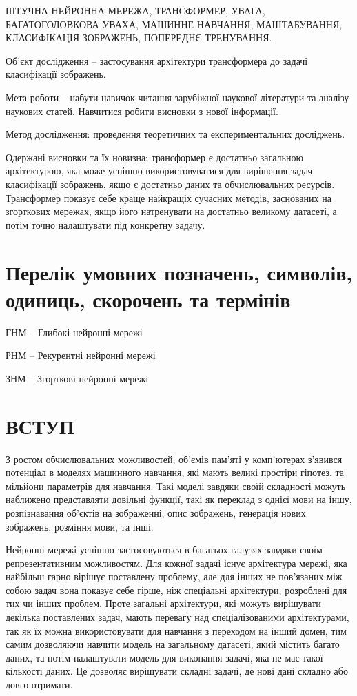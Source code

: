 \documentclass[a4paper,14pt]{extreport}
\newcommand\uchapter[1]{%
  \chapter*{#1}%
  \addcontentsline{toc}{chapter}{\xmakefirstuc{\lowercase{#1}}}}
\begin{document}
\vspace{\baselineskip}

ШТУЧНА НЕЙРОННА МЕРЕЖА, ТРАНСФОРМЕР,
УВАГА, БАГАТОГОЛОВКОВА УВАХА, МАШИННЕ НАВЧАННЯ,
МАШТАБУВАННЯ, КЛАСИФІКАЦІЯ ЗОБРАЖЕНЬ,
ПОПЕРЕДНЄ ТРЕНУВАННЯ.

\vspace{\baselineskip}

Об’єкт дослідження -- застосування архітектури
трансформера до задачі класифікації зображень.

Мета роботи -- набути навичок читання зарубіжної наукової літератури та аналізу наукових статей. Навчитися робити висновки з нової інформації.

Метод дослідження: проведення теоретичних та експериментальних досліджень.

Одержані висновки та їх новизна: трансформер є достатньо загальною
архітектурою, яка може успішно використовуватися для вирішення задач
класифікації зображень, якщо є достатньо даних та обчислювальних ресурсів.
Трансформер показує себе краще найкращіх сучасних методів, заснованих на
згорткових мережах, якщо його натренувати на достатньо великому датасеті,
а потім точно налаштувати під конкретну задачу.

\newpage
\tableofcontents

\newpage
\chapter*{Перелік умовних позначень, символів, одиниць, скорочень та термінів}
ГНМ -- Глибокі нейронні мережі

РНМ -- Рекурентні нейронні мережі

ЗНМ -- Згорткові нейронні мережі



\newpage
{}
\setcounter{page}{7}
\uchapter{ВСТУП}
З ростом обчислювальних можливостей, об'ємів пам'яті у комп'ютерах
з'явився потенціал в моделях машинного навчання, які мають
великі простіри гіпотез, та мільйони параметрів для навчання.
Такі моделі завдяки своїй складності можуть наближено представляти
довільні функції, такі як переклад з однієї мови на іншу,
розпізнавання об'єктів на зображенні, опис зображень,
генерація нових зображень, розміння мови, та інші.

Нейронні мережі успішно застосовуються в багатьох галузях
завдяки своїм репрезентативним можливостям. Для кожної задачі
існує архітектура мережі, яка найбільш гарно вірішує поставлену
проблему, але для інших не пов'язаних між собою задач вона
показує себе гірше, ніж спеціальні архітектури, розроблені
для тих чи інших проблем. Проте загальні архітектури,
які можуть вирішувати декілька поставлених задач, мають
перевагу над спеціалізованими архітектурами, так як їх
можна використовувати для навчання з переходом на інший домен,
тим самим дозволяючи навчити модель на загальному датасеті,
який містить багато даних,
та потім налаштувати модель для виконання задачі, яка не має такої
кількості даних. Це дозволяє вирішувати складні задачі, де
нові дані складно або довго отримати.
\end{document}
